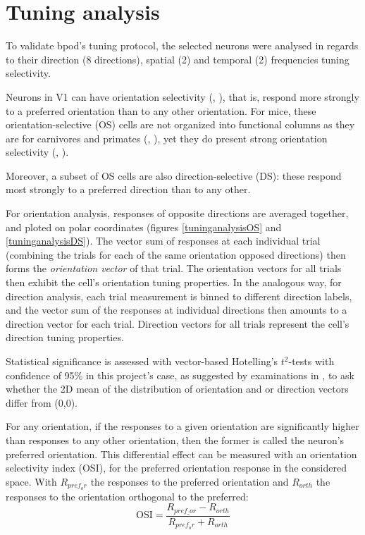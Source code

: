 \section{Tuning analysis}
\label{tuningresults}

To validate bpod's tuning protocol, the selected neurons were analysed in regards to their direction (8 directions), spatial (2) and temporal (2) frequencies tuning selectivity.

Neurons in V1 can have orientation selectivity (\cite{Hubel1959}, \cite{Hubel1962}), that is, respond more strongly to a preferred orientation than to any other orientation. For mice, these orientation-selective (OS) cells are not organized into functional columns as they are for carnivores and primates (\cite{Hubel1962}, \cite{Hubel1968}), yet they do present strong orientation selectivity (\cite{Girman1999}, \cite{Ohki2005}). 

Moreover, a subset of  OS cells are also direction-selective (DS): these respond most strongly to a preferred direction than to any other.

For orientation analysis, responses of opposite directions are averaged together, and ploted on polar coordinates (figures \ref{tuninganalysisOS} and \ref{tuninganalysisDS}). The vector sum of responses at each individual trial (combining the trials for each of the same orientation opposed directions) then forms the \textit{orientation vector} of that trial. The orientation vectors for all trials then exhibit the cell's orientation tuning properties.
In the analogous way, for direction analysis, each trial measurement is binned to different direction labels, and the vector sum of the responses at individual directions then amounts to a direction vector for each trial. Direction vectors for all trials represent the cell's direction tuning properties.

Statistical significance is assessed with vector-based Hotelling's $t^2$-tests with confidence of 95\% in this project's case, as suggested by examinations in \cite{Mazurek2014}, to ask whether the 2D mean of the distribution of orientation and or direction vectors differ from (0,0).
 
 For any orientation, if the responses to a given orientation are significantly higher than responses to any other orientation, then the former is called the neuron's preferred orientation. This differential effect can be measured with an orientation selectivity index (OSI), for the preferred orientation response in the considered space. With  $R_{pref_or}$ the responses to the preferred orientation and $R_{orth}$ the responses to the orientation orthogonal to the preferred:
\begin{equation}
\text{OSI}= \dfrac{R_{pref\_or} - R_{orth}}{R_{pref_or} + R_{orth}}
\end{equation}

